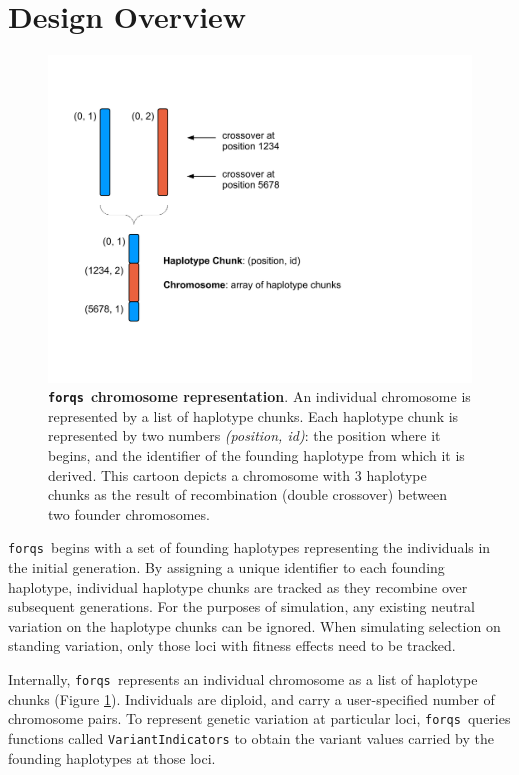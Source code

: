 \documentclass{article}
\newcommand{\forqs}[0]{\texttt{forqs }}
\begin{document}
\clearpage




\section{Design Overview}

\vspace{-1ex}

\begin{figure}[!h]
    \centerline{\includegraphics[width=.7\textwidth]{fig/HaplotypeChunk_cropped.pdf}}
    \caption{{\bf \forqs chromosome representation}.  An individual chromosome is  
        represented by a list of haplotype chunks.  Each haplotype chunk is
        represented by two numbers \emph{(position, id)}: the position where it
        begins, and the identifier of the founding haplotype from which it is
        derived.  This cartoon depicts a chromosome with 3 haplotype chunks as
        the result of recombination (double crossover) between two founder
        chromosomes.}
    \label{figure_haplotype_chunk}
\end{figure}

\vspace{-1ex}

\forqs begins with a set of founding haplotypes representing the individuals in
the initial generation.  By assigning a unique identifier to each founding
haplotype, individual haplotype chunks are tracked as they recombine over
subsequent generations.  For the purposes of simulation, any existing neutral
variation on the haplotype chunks can be ignored.  When simulating selection on
standing variation, only those loci with fitness effects
need to be tracked.

Internally, \forqs represents an individual chromosome as a list of haplotype
chunks (Figure \ref{figure_haplotype_chunk}).  Individuals
are diploid, and carry a user-specified number of chromosome pairs.  To
represent genetic variation at particular loci, \forqs queries functions called
\texttt{VariantIndicators} to obtain the variant values carried by the
founding haplotypes at those loci.
\end{document}
